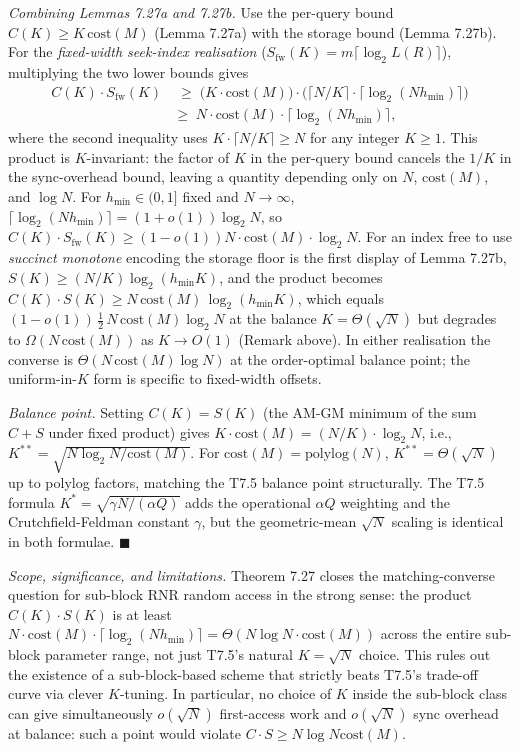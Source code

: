 \documentclass[
]{article}
\begin{document}
\emph{Combining Lemmas 7.27a and 7.27b.} Use the per-query bound
$C(K)\ge K\,\mathrm{cost}(M)$ (Lemma 7.27a) with the storage bound
(Lemma 7.27b). For the \emph{fixed-width seek-index realisation}
($S_{\mathrm{fw}}(K)=m\lceil\log_2 L(R)\rceil$), multiplying the two
lower bounds gives
\begin{align*}
C(K) \cdot S_{\mathrm{fw}}(K) &\;\geq\; \bigl(K \cdot \mathrm{cost}(M)\bigr)
\cdot \bigl(\lceil N/K \rceil \cdot \lceil \log_2(N h_{\min}) \rceil\bigr) \\
&\geq\; N \cdot \mathrm{cost}(M) \cdot
\lceil \log_2(N h_{\min}) \rceil ,
\end{align*}
where the second inequality uses $K \cdot \lceil N/K \rceil \geq N$
for any integer $K \geq 1$. This product is $K$-invariant: the factor
of $K$ in the per-query bound cancels the $1/K$ in the sync-overhead
bound, leaving a quantity depending only on $N$, $\mathrm{cost}(M)$,
and $\log N$. For $h_{\min} \in (0, 1]$ fixed and $N \to \infty$,
$\lceil \log_2(N h_{\min}) \rceil = (1 + o(1)) \log_2 N$, so
$C(K) \cdot S_{\mathrm{fw}}(K) \geq (1 - o(1)) N \cdot \mathrm{cost}(M)
\cdot \log_2 N$. For an index free to use \emph{succinct monotone}
encoding the storage floor is the first display of Lemma 7.27b,
$S(K)\ge (N/K)\log_2(h_{\min}K)$, and the product becomes
$C(K)\cdot S(K) \ge N\,\mathrm{cost}(M)\,\log_2(h_{\min}K)$, which
equals $(1-o(1))\,\tfrac12\,N\,\mathrm{cost}(M)\log_2 N$ at the
balance $K=\Theta(\sqrt N)$ but degrades to
$\Omega(N\,\mathrm{cost}(M))$ as $K\to O(1)$ (Remark above). In
either realisation the converse is $\Theta(N\,\mathrm{cost}(M)\log N)$
at the order-optimal balance point; the uniform-in-$K$ form is
specific to fixed-width offsets.

\emph{Balance point.} Setting $C(K) = S(K)$ (the AM-GM minimum of
the sum $C + S$ under fixed product) gives $K \cdot \mathrm{cost}(M)
= (N/K) \cdot \log_2 N$, i.e., $K^{**} = \sqrt{N \log_2 N /
\mathrm{cost}(M)}$. For $\mathrm{cost}(M) = \mathrm{polylog}(N)$,
$K^{**} = \Theta(\sqrt{N})$ up to polylog factors, matching the
T7.5 balance point structurally. The T7.5 formula
$K^* = \sqrt{\gamma N / (\alpha Q)}$ adds the
operational $\alpha Q$ weighting and the Crutchfield-Feldman
constant $\gamma$, but the geometric-mean $\sqrt{N}$ scaling is
identical in both formulae. \hfill$\blacksquare$

\emph{Scope, significance, and limitations.} Theorem 7.27 closes the
matching-converse question for sub-block RNR random access in the
strong sense: the product $C(K) \cdot S(K)$ is at least
$N \cdot \mathrm{cost}(M) \cdot \lceil \log_2(N h_{\min}) \rceil =
\Theta(N \log N \cdot \mathrm{cost}(M))$ across the entire
sub-block parameter range, not just T7.5's natural $K = \sqrt{N}$
choice. This rules out the existence of a sub-block-based scheme
that strictly beats T7.5's trade-off curve via clever $K$-tuning. In
particular, no choice of $K$ inside the sub-block class can give
simultaneously $o(\sqrt{N})$ first-access work and $o(\sqrt{N})$ sync
overhead at balance: such a point would violate
$C \cdot S \geq N \log N \mathrm{cost}(M)$.
\end{document}
